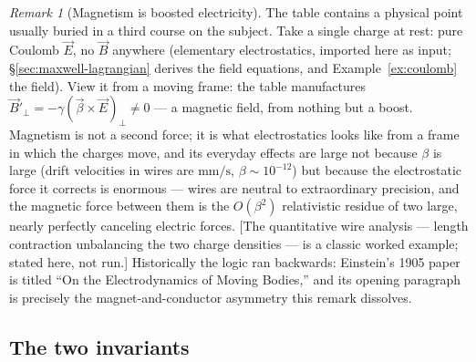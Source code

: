 \documentclass[11pt]{article}
\theoremstyle{plain}
\theoremstyle{definition}
\theoremstyle{remark}
\newtheorem{remark}[theorem]{Remark}
\newcommand{\vE}{\vec{E}}
\newcommand{\vB}{\vec{B}}
\begin{document}
\begin{remark}[Magnetism is boosted electricity]
\label{rem:magnetism-is-relativity}
The table contains a physical point usually buried in a third
course on the subject. Take a single charge at rest: pure Coulomb
$\vE$, no $\vB$ anywhere (elementary electrostatics, imported here as
input; \S\ref{sec:maxwell-lagrangian} derives the field equations, and
Example~\ref{ex:coulomb} the field). View it from a moving frame: the table
manufactures $\vB'_\perp = -\gamma(\vec\beta\times\vE)_\perp \neq 0$
--- a magnetic field, from nothing but a boost. Magnetism is not a
second force; it is what electrostatics looks like from a frame in
which the charges move, and its everyday effects are large not
because $\beta$ is large (drift velocities in wires are
$\mathrm{mm/s}$, $\beta \sim 10^{-12}$) but because the electrostatic
force it corrects is enormous --- wires are neutral to
extraordinary precision, and the magnetic force between them is the
$O(\beta^2)$ relativistic residue of two large, nearly perfectly
canceling electric forces. [The quantitative wire analysis --- length
contraction unbalancing the two charge densities --- is a classic
worked example; stated here, not run.] Historically the logic ran
backwards: Einstein's 1905 paper is titled ``On the Electrodynamics
of Moving Bodies,'' and its opening paragraph is precisely the
magnet-and-conductor asymmetry this remark dissolves.
\end{remark}

\subsection{The two invariants}
\label{sec:two-invariants}
\end{document}
